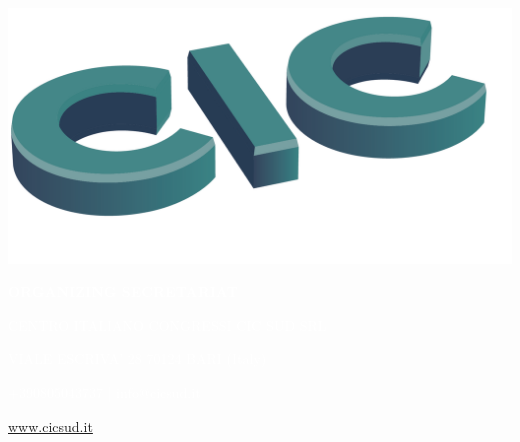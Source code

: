 \documentclass[
	openany, %
	parskip=full, %
	12pt, %
	a4paper, %
]{conferencebooklet} %
\begin{document}
\newpage
~\vfill %
\thispagestyle{empty} %

\begin{center}

\includegraphics[width=0.25\linewidth]{logos/CIC-30anni-Fondo-scuro.png}

\textcolor{white}{\textbf{ORGANIZING SECRETARIAT}}

\textcolor{white}{CENTRO ITALIANO CONGRESSI CIC SUD SRL}

\textcolor{white}{VIALE ESCRIVA’ 28 70124 BARI (Italy)}

\textcolor{white}{+390805043737 | info@cicsud.it}

\textcolor{white}{\url{www.cicsud.it}}
\end{center}




\thispagestyle{empty} %
\pagecolor{myblue} %
~

\end{document}

